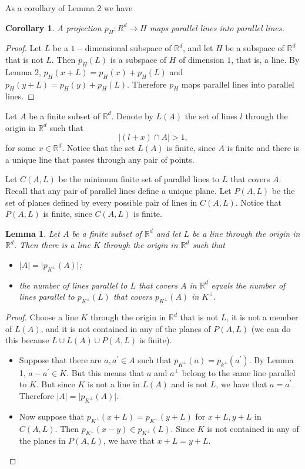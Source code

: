 \documentclass[12pt]{article}
\newcommand{\R}{\mathbb{R}}
\newtheorem{lemma}{Lemma}
\newtheorem{corollary}{Corollary}
\begin{document}
As a corollary of Lemma 2 we have
\begin{corollary}
A projection $p_{H}: R^d \rightarrow H$ maps parallel lines into parallel lines. 
\end{corollary}
\begin{proof}
    Let $L$ be a $1-$dimensional subspace of $\R^d$, and let $H$ be a subspace of $\R^d$ that is not $L.$ Then $p_H(L)$ is a subspace of $H$ of dimension $1$, that is, a line. By Lemma 2, $p_H(x + L) = p_H(x) + p_H(L)$ and $p_H(y + L) = p_H(y) + p_H(L)$. Therefore $p_H$ maps parallel lines into parallel lines. 
\end{proof}
Let $A$ be a finite subset of $\R^d$. Denote by $L(A)$ the set of lines $l$ through the origin in $\R^d$ such that
$$\lvert (l + x) \cap A \rvert > 1,$$
for some $x \in \R^d$. Notice that the set $L(A)$ is finite, since $A$ is finite and there is a unique line that passes through any pair of points. 

Let $C(A,L)$ be the minimum finite set of parallel lines to $L$ that covers $A$. Recall that any pair of parallel lines define a unique plane. Let $P(A, L)$ be the set of planes defined by every possible pair of lines in $C(A,L)$. Notice that $P(A, L)$ is finite, since $C(A,L)$ is finite. 

\begin{lemma}
    Let $A$ be a finite subset of $\R^d$ and let $L$ be a line through the origin in $\R^d$. Then there is a line $K$ through the origin in $\R^d$ such that
    \begin{itemize}
        \item[i)] $\lvert A \rvert  = \lvert p_{K^\perp}(A) \rvert$;
        \item[ii)] the number of lines parallel to $L$ that covers $A$ in $\R^d$ equals the number of lines parallel to $p_{K^\perp}(L)$ that covers $p_{K^\perp}(A)$ in $K^\perp.$
        
    \end{itemize}
\end{lemma}
\begin{proof}

Choose a line $K$ through the origin in $\R^d$ that is not $L$, it is not a member of $L(A)$, and it is not contained in any of the planes of $P(A,L)$  (we can do this because $L \cup L(A) \cup P(A,L)$ is finite). 
\begin{itemize}
\item[i)]  Suppose that there are $a, a^\prime \in A$ such that $p_{K^\perp}(a) = p_{k^\perp}(a^\prime).$ By Lemma 1, $a - a^\prime \in K.$ But this means that $a$ and $a^\perp$ belong to the same line parallel to $K$. But since $K$ is not a line in $L(A)$ and is not $L$, we have that $a = a^\prime.$ Therefore $\lvert A \rvert  = \lvert p_{K^\perp}(A) \rvert$.
\item[ii)] Now suppose that $p_{K^\perp}(x + L) = p_{K^\perp}( y + L)$ for $x + L, y + L$ in $C(A, L).$ Then $p_{K^\perp}(x-y) \in p_{K^\perp}(L)$. Since $K$ is not contained in any of the planes in $P(A, L)$, we have that $x + L = y + L.$ 
\end{itemize}
\end{proof}
\end{document}
